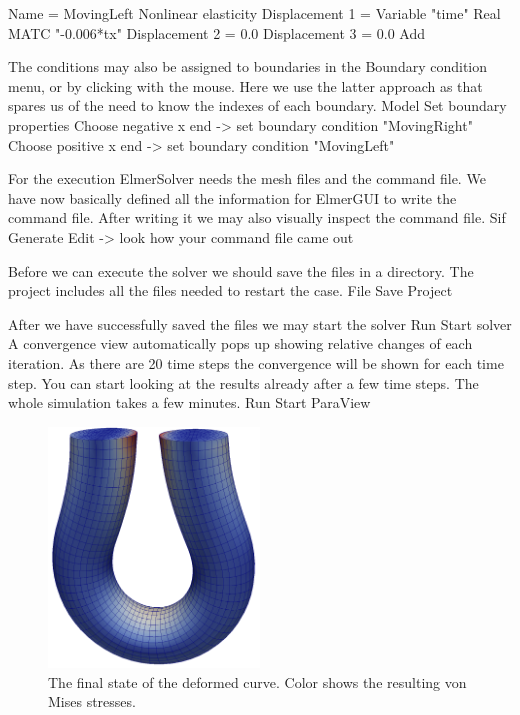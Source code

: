     Name = MovingLeft 
    Nonlinear elasticity
      Displacement 1 = Variable "time"
        Real MATC "-0.006*tx"
      Displacement 2 = 0.0
      Displacement 3 = 0.0
    Add 
\ttend   

The conditions may also be assigned to boundaries in the Boundary condition menu, or 
by clicking with the mouse. Here we use the latter approach as that spares us of the 
need to know the indexes of each boundary.
\ttbegin
Model
  Set boundary properties
    Choose negative x end -> set boundary condition "MovingRight"
    Choose positive x end  -> set boundary condition "MovingLeft"
\ttend

For the execution 
ElmerSolver needs the mesh files and the command file. We have now basically defined
all the information for ElmerGUI to write the command file. After writing it we may also visually 
inspect the command file.
\ttbegin
Sif 
  Generate
  Edit -> look how your command file came out  
\ttend

Before we can execute the solver we should save the files in a directory. The project includes
all the files needed to restart the case.
\ttbegin
File 
  Save Project
\ttend

After we have successfully saved the files we may start the solver
\ttbegin
Run
  Start solver
\ttend
A convergence view automatically pops up showing relative changes of each iteration.
As there are 20 time steps the convergence will be shown for each time step.
You can start looking at the results already after a few time steps. The whole simulation
takes a few minutes. 
\ttbegin
Run
  Start ParaView
\ttend


\begin{figure}[h!]
\begin{center}
  \includegraphics[width=0.5\textwidth]{UturnVonMisesStressMesh}
  \caption{The final state of the deformed curve. Color shows the resulting von Mises stresses.}
  \label{fig:UturnVonMisesStress}
\end{center}
\end{figure}

